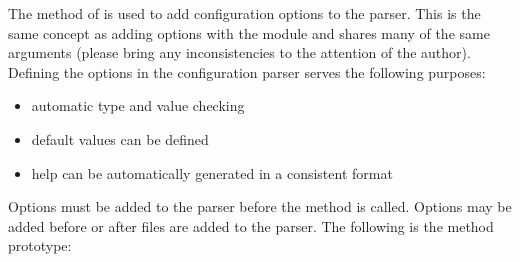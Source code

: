 \documentclass{howto}
\begin{document}
The  method of  is used to add configuration 
options to the parser.  This is the same concept as adding options with the
 module and shares many of the same arguments (please bring any
inconsistencies to the attention of the author).  Defining the 
options in the configuration parser serves the following purposes:

\begin{itemize}
\item automatic type and value checking 
\item default values can be defined
\item help can be automatically generated in a consistent format
\end{itemize}

Options must be added to the parser before the  method is called.
Options may be added before or after files are added to the parser.  
The following is the  method prototype:
\end{document}
